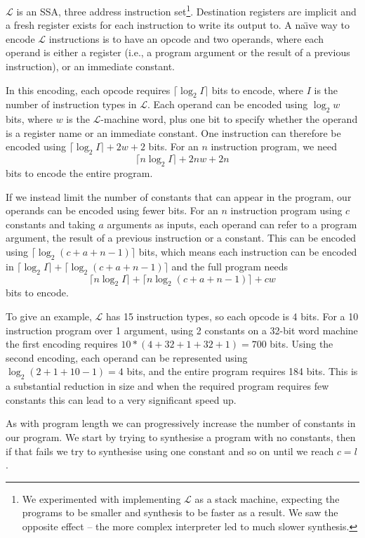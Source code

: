 \documentclass[a4paper]{llncs}
\begin{document}
$\mathcal{L}$ is an SSA, three address instruction set\footnote{
We experimented with implementing $\mathcal{L}$ as a stack machine, expecting
the programs to be smaller and synthesis to be faster as a result.  We saw
the opposite effect -- the more complex interpreter led to much slower synthesis.
}.  Destination registers
are implicit and a fresh register exists for each instruction to write its
output to.  A na\"{\i}ve way to encode $\mathcal{L}$ instructions is to have an
opcode and two operands, where each operand is either a register (i.e., a program argument
or the result of a previous instruction), or an immediate constant.

In this encoding, each opcode requires $\lceil \log_2 I \rceil$ bits to encode, where $I$ is the number
of instruction types in $\mathcal{L}$.  Each operand can be encoded using
$\log_2 w$ bits, where $w$ is the $\mathcal{L}$-machine word, plus one
bit to specify whether the operand is a register name or an immediate constant.
One instruction can therefore be encoded using $\lceil \log_2 I \rceil + 2w + 2$ bits.
For an $n$ instruction program, we need $$\lceil n \log_2 I \rceil + 2nw + 2n$$ bits to encode
the entire program.

If we instead limit the number of constants that can appear in the program,
our operands can be encoded using fewer bits.  For an $n$ instruction program
using $c$ constants and taking $a$ arguments as inputs, each operand can refer
to a program argument, the result of a previous instruction or a constant.
This can be encoded using $\lceil \log_2 (c+a+n-1) \rceil$ bits, which means each instruction
can be encoded in $\lceil \log_2 I \rceil + \lceil \log_2 (c + a + n - 1) \rceil$ and the full program
needs $$\lceil n \log_2 I \rceil + \lceil n \log_2 (c + a + n - 1) \rceil + cw$$ bits to encode.

To give an example, $\mathcal{L}$ has 15 instruction types, so each opcode is 4 bits.
For a 10 instruction program over 1 argument, using 2 constants on a 32-bit word
machine the first encoding requires $10 * (4 + 32 + 1 + 32 + 1) = 700$ bits.
Using the second encoding, each operand can be represented using
$\log_2 (2 + 1 + 10 - 1) = 4$ bits, and the entire program requires 184 bits.
This is a substantial reduction in size and when the required program requires
few constants this can lead to a very significant speed up.

As with program length we can progressively increase the number of constants in
our program.  We start by trying to synthesise a program with no constants, then
if that fails we try to synthesise using one constant and so on until we reach
$c = l$.
\end{document}
